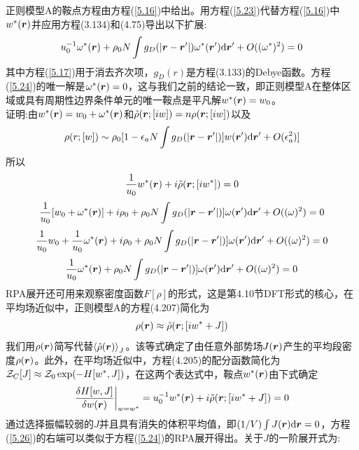 正则模型A的鞍点方程由方程(\ref{5.16})中给出。用方程(\ref{5.23})代替方程(\ref{5.16})中$w^*(\bm{r})$并应用方程(3.134)和(4.75)导出以下扩展:
\begin{equation}\label{5.24}
u_0^{-1}\omega^*(\bm{r})+\rho_0N\int g_D(\left|\bm{r}-\bm{r}'\right|)\omega^*(\bm{r}')\mathrm{d}\bm{r}'+O((\omega^*)^2)=0
\end{equation}
其中方程(\ref{5.17})用于消去齐次项，$g_D(r)$是方程(3.133)的Debye函数。方程(\ref{5.24})的唯一解是$\omega^*(\bm{r})=0$，这与我们之前的结论一致，即正则模型A在整体区域或具有周期性边界条件单元的唯一鞍点是平凡解$w^*(\bm{r})=w_0$。\\
证明:由$w^*(\bm{r})=w_0+\omega^*(\bm{r})$和$\tilde{\rho}(\bm{r};[iw])=n\rho(\bm{r};[iw])$以及
\begin{equation*}
\rho(r;[w])\sim\rho_0[1-\epsilon_aN\int g_D(|\bm{r}-\bm{r}'|)]w(\bm{r}')\mathrm{d}\bm{r}'+O(\epsilon_a^2)]
\end{equation*}
所以
\begin{equation*}
\frac{1}{u_0}w^*(\bm{r})+i\tilde{\rho}(\bm{r};[iw^*])=0
\end{equation*}
\begin{equation*}
\frac{1}{u_0}[w_0+\omega^*(\bm{r})]+i\rho_0+\rho_0N\int g_D(|\bm{r}-\bm{r}'|)]\omega(\bm{r}')\mathrm{d}\bm{r}'+O((\omega)^2)=0
\end{equation*}
\begin{equation*}
\frac{1}{u_0}w_0+\frac{1}{u_0}\omega^*(\bm{r})+i\rho_0+\rho_0N\int g_D(|\bm{r}-\bm{r}'|)]\omega(\bm{r}')\mathrm{d}\bm{r}'+O((\omega)^2)=0
\end{equation*}
\begin{equation*}
\frac{1}{u_0}\omega^*(\bm{r})+\rho_0N\int g_D(|\bm{r}-\bm{r}'|)]\omega(\bm{r}')\mathrm{d}\bm{r}'+O((\omega)^2)=0
\end{equation*}
RPA展开还可用来观察密度函数$F[\rho]$的形式，这是第4.10节DFT形式的核心，在平均场近似中，正则模型A的方程(4.207)简化为
\begin{equation}\label{5.25}
\rho(\bm{r})\approx\tilde{\rho}(\bm{r};[iw^*+J])
\end{equation}
我们用$\rho(\bm{r})$简写代替$\left\langle\hat{\rho}(\bm{r})\right\rangle_J$。该等式确定了由任意外部势场$J(\bm{r})$产生的平均段密度$\rho(\bm{r})$。此外，在平均场近似中，方程(4.205)的配分函数简化为$\mathcal{Z}_C[J]\approx\mathcal{Z}_0\exp(-H[w^*,J])$，在这两个表达式中，鞍点$w^*(\bm{r})$由下式确定
\begin{equation}\label{5.26}
\frac{\delta H[w,J]}{\delta w(\bm{r})}\bigg|_{w=w^*}=u_0^{-1}w^*(\bm{r})+i\tilde{\rho}(\bm{r};[iw^*+J])=0
\end{equation}
通过选择振幅较弱的$J$并且具有消失的体积平均值，即$(1/V)\int J(\bm{r})\mathrm{d}\bm{r}=0$，方程(\ref{5.26})的右端可以类似于方程(\ref{5.24})的RPA展开得出。关于$J$的一阶展开式为:
